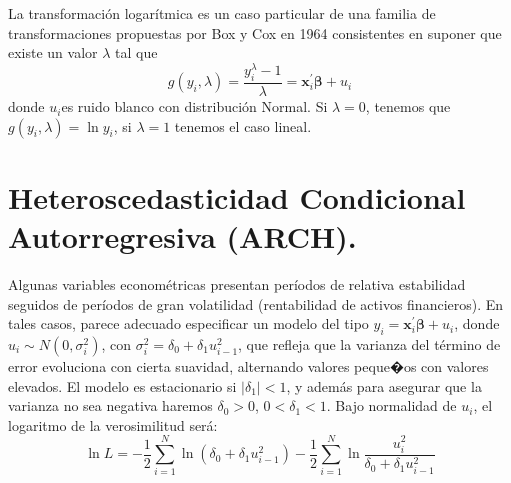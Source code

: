 La transformaci\'on logar\'itmica es un caso particular de una familia
de transformaciones propuestas por Box y Cox en 1964 consistentes
en suponer que existe un valor $\lambda$ tal que 
\[
g\left(y_{i},\lambda\right)=\dfrac{y_{i}^{\lambda}-1}{\lambda}=\boldsymbol{x}_{i}^{\prime}\boldsymbol{\beta}+u_{i}
\]
donde $u_{i}$es ruido blanco con distribuci\'on Normal. Si $\lambda=0$,
tenemos que $g\left(y_{i},\lambda\right)=\ln y_{i}$, si $\lambda=1$
tenemos el caso lineal.


\section{Heteroscedasticidad Condicional Autorregresiva (ARCH).}

Algunas variables econom\'etricas presentan per\'iodos de relativa estabilidad
seguidos de per\'iodos de gran volatilidad (rentabilidad de activos
financieros). En tales casos, parece adecuado especificar un modelo
del tipo $y_{i}=\boldsymbol{x}_{i}^{\prime}\boldsymbol{\beta}+u_{i}$,
donde $u_{i}\sim N\left(0,\sigma_{i}^{2}\right)$, con $\sigma_{i}^{2}=\delta_{0}+\delta_{1}u_{i-1}^{2}$,
que refleja que la varianza del t\'ermino de error evoluciona con cierta
suavidad, alternando valores peque�os con valores elevados. El modelo
es estacionario si $\left|\delta_{1}\right|<1$, y adem\'as para asegurar
que la varianza no sea negativa haremos $\delta_{0}>0$, $0<\delta_{1}<1$.
Bajo normalidad de $u_{i}$, el logaritmo de la verosimilitud ser\'a:
\[
\ln L=-\dfrac{1}{2}\sum_{i=1}^{N}\ln\left(\delta_{0}+\delta_{1}u_{i-1}^{2}\right)-\dfrac{1}{2}\sum_{i=1}^{N}\ln\dfrac{u_{i}^{2}}{\delta_{0}+\delta_{1}u_{i-1}^{2}}
\]



